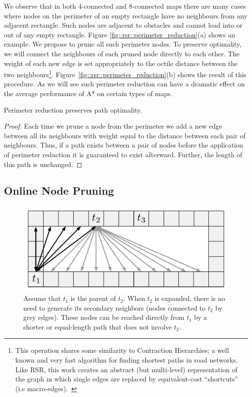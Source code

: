 We observe that in both 4-connected and 8-connected maps there are many cases
where nodes on the perimeter of an empty rectangle have no neighbours from any
adjacent rectangle.  Such nodes are adjacent to obstacles and cannot lead into
or out of any empty rectangle.  Figure \ref{fig::rsr::perimeter_reduction}(a)
shows an example.  We propose to prune all such perimeter nodes. To preserve
optimality, we will connect the neighbours of each pruned node directly to
each other.  The weight of each new edge is set appropriately to the octile
distance between the two neighbours\footnote{This operation shares some similarity
to Contraction Hierarchies; a well known and very fast algorithm for finding
shortest paths in road networks. Like RSR, this work creates an abstract
(but multi-level) representation of the graph in which single edges are replaced 
by equivalent-cost ``shortcuts'' (i.e macro-edges).~\cite{geisberger08}}.
Figure~\ref{fig::rsr::perimeter_reduction}(b) shows the result of this
procedure.  As we will see such perimeter reduction can have a dramatic effect
on the average performance of A* on certain types of maps.
\begin{lemma}
Perimeter reduction preserves path optimality.
\end{lemma}
\begin{proof}
Each time we prune a node from the perimeter we add a new edge between
all its neighbours with weight equal to the distance between each pair
of neighbours.  Thus, if a path exists between a pair of nodes before the
application of perimeter reduction it is guaranteed to exist afterward.
Further, the length of this path is unchanged.
\end{proof}

\subsection{Online Node Pruning}
\label{cha::rsr::online_pruning}

\begin{figure}[bt]
	\begin{center}
	\includegraphics[width=0.5\columnwidth, trim = 10mm 10mm 10mm 0mm]
	{chapter_rsr/diagrams/online_pruning.pdf}
	\end{center}
	\vspace{-3pt}
	\caption[RSR enhancement: online pruning]
    {\small
	Assume that $t_{1}$ is the parent of $t_2$. When $t_2$
	is expanded, there is no need to generate its secondary neighbors
	(nodes connected to $t_2$ by grey edges). These nodes can be reached directly 
	from $t_1$ by a shorter or equal-length path that does not involve $t_2$.
}
\label{fig::rsr::online_pruning}
\end{figure}

